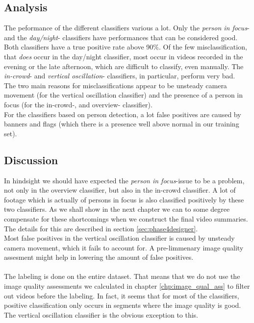 \subsection{Analysis}
%
The peformance of the different classifiers various a lot. Only the \textit{person in focus}- and the \textit{day/night}- classifiers have performances that can be considered good. Both classifiers have a true positive rate above 90\%. Of the few misclassification, that \textit{does} occur in the day/night classifier, most occur in videos recorded in the evening or the late afternoon, which are difficult to classify, even manually. The \textit{in-crowd}- and \textit{vertical oscillation}- classifiers, in particular, perform very bad.\\
The two main reasons for misclassifications appear to be unsteady camera movement (for the vertical oscillation classifier) and the presence of a person in focus (for the in-crowd-, and overview- classifier).\\
For the classifiers based on person detection, a lot false positives are caused by banners and flags (which there is a presence well above normal in our training set).
%
\subsection{Discussion}\label{sec:phase2discussion}
%
In hindsight we should have expected the \textit{person in focus}-issue to be a problem, not only in the overview classifier, but also in the in-crowd classifier. A lot of footage which is actually of persons in focus is also classified positively by these two classifiers. As we shall show in the next chapter we can to some degree compensate for these shortcomings when we construct the final video summaries. The details for this are described in section \ref{sec:phase4designer}.\\
Most false positives in the vertical oscillation classifier is caused by unsteady camera movement, which it fails to account for. A pre-limmenary image quality assesment might help in lowering the amount of false positives.\\
\\
The labeling is done on the entire dataset. That means that we do not use the image quality assessments we calculated in chapter \ref{chp:image_qual_ass} to filter out videos before the labeling. In fact, it seems that for most of the classifiers, positive classification only occurs in segments where the image quality is good. The vertical oscillation classifier is the obvious exception to this.
%
